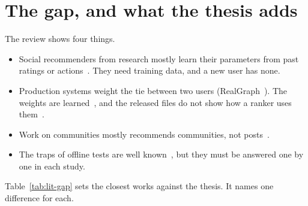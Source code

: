 \section{The gap, and what the thesis adds}
\label{sec:lit-gap}

The review shows four things.
\begin{itemize}
  \item Social recommenders from research mostly learn their parameters from past ratings or actions~. They need training data, and a new user has none.
  \item Production systems weight the tie between two users (RealGraph~). The weights are learned~, and the released files do not show how a ranker uses them~.
  \item Work on communities mostly recommends communities, not posts~.
  \item The traps of offline tests are well known~, but they must be answered one by one in each study.
\end{itemize}

Table~\ref{tab:lit-gap} sets the closest works against the thesis. It names one difference for each.

